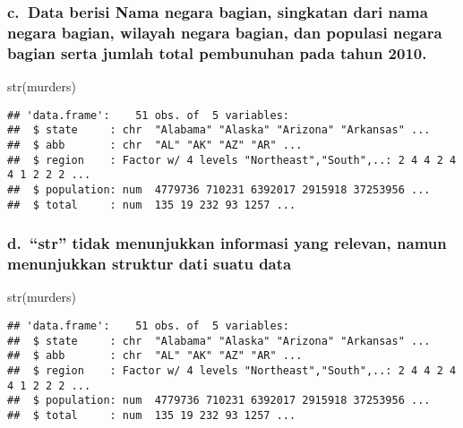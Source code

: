\documentclass[
]{article}
\newenvironment{Shaded}{\begin{snugshade}}{\end{snugshade}}
\newcommand{\FunctionTok}[1]{\textcolor[rgb]{0.00,0.00,0.00}{#1}}
\newcommand{\NormalTok}[1]{#1}
\begin{document}
\hypertarget{c.-data-berisi-nama-negara-bagian-singkatan-dari-nama-negara-bagian-wilayah-negara-bagian-dan-populasi-negara-bagian-serta-jumlah-total-pembunuhan-pada-tahun-2010.}{%
\subsubsection{c.~Data berisi Nama negara bagian, singkatan dari nama
negara bagian, wilayah negara bagian, dan populasi negara bagian serta
jumlah total pembunuhan pada tahun
2010.}\label{c.-data-berisi-nama-negara-bagian-singkatan-dari-nama-negara-bagian-wilayah-negara-bagian-dan-populasi-negara-bagian-serta-jumlah-total-pembunuhan-pada-tahun-2010.}}

\begin{Shaded}
\begin{Highlighting}[]
\FunctionTok{str}\NormalTok{(murders)}
\end{Highlighting}
\end{Shaded}

\begin{verbatim}
## 'data.frame':    51 obs. of  5 variables:
##  $ state     : chr  "Alabama" "Alaska" "Arizona" "Arkansas" ...
##  $ abb       : chr  "AL" "AK" "AZ" "AR" ...
##  $ region    : Factor w/ 4 levels "Northeast","South",..: 2 4 4 2 4 4 1 2 2 2 ...
##  $ population: num  4779736 710231 6392017 2915918 37253956 ...
##  $ total     : num  135 19 232 93 1257 ...
\end{verbatim}

\hypertarget{d.-str-tidak-menunjukkan-informasi-yang-relevan-namun-menunjukkan-struktur-dati-suatu-data}{%
\subsubsection{d.~``str'' tidak menunjukkan informasi yang relevan,
namun menunjukkan struktur dati suatu
data}\label{d.-str-tidak-menunjukkan-informasi-yang-relevan-namun-menunjukkan-struktur-dati-suatu-data}}

\begin{Shaded}
\begin{Highlighting}[]
\FunctionTok{str}\NormalTok{(murders)}
\end{Highlighting}
\end{Shaded}

\begin{verbatim}
## 'data.frame':    51 obs. of  5 variables:
##  $ state     : chr  "Alabama" "Alaska" "Arizona" "Arkansas" ...
##  $ abb       : chr  "AL" "AK" "AZ" "AR" ...
##  $ region    : Factor w/ 4 levels "Northeast","South",..: 2 4 4 2 4 4 1 2 2 2 ...
##  $ population: num  4779736 710231 6392017 2915918 37253956 ...
##  $ total     : num  135 19 232 93 1257 ...
\end{verbatim}
\end{document}
